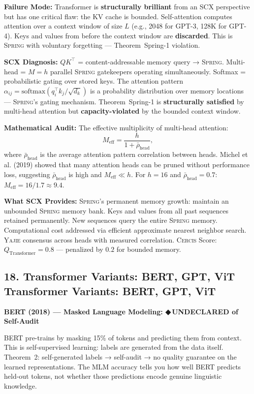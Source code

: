 \documentclass[12pt,a4paper]{article}
\theoremstyle{definition}
\newcommand{\guilty}{{\color{guiltycolor}\textbf{◆\,UNDECLARED}}}
\newcommand{\Yajie}{\textsc{Yajie}}
\newcommand{\Spring}{\textsc{Spring}}
\newcommand{\Cercis}{\textsc{Cercis}}
\newcommand{\SCX}{\textsc{SCX}}
\newcommand{\auditHeader}[1]{\medskip\noindent\textbf{\large #1}\medskip}
\newcommand{\whyFail}{\noindent\textbf{Failure Mode:} }
\newcommand{\whatMissing}{\noindent\textbf{What SCX Provides:} }
\newcommand{\diagnosis}{\noindent\textbf{SCX Diagnosis:} }
\newcommand{\mathAudit}{\noindent\textbf{Mathematical Audit:} }
\begin{document}
\whyFail{} Transformer is \textbf{structurally brilliant} from an \SCX{} perspective but has one critical flaw: the KV cache is bounded. Self-attention computes attention over a context window of size $L$ (e.g., 2048 for GPT-3, 128K for GPT-4). Keys and values from before the context window are \textbf{discarded}. This is \Spring{} with voluntary forgetting — Theorem~Spring-1 violation.

\diagnosis{} $QK^\top$ = content-addressable memory query → \Spring{}. Multi-head = $M = h$ parallel \Spring{} gatekeepers operating simultaneously. Softmax = probabilistic gating over stored keys. The attention pattern $\alpha_{ij} = \text{softmax}(q_i^\top k_j / \sqrt{d_k})$ is a probability distribution over memory locations — \Spring{}'s gating mechanism. Theorem~Spring-1 is \textbf{structurally satisfied} by multi-head attention but \textbf{capacity-violated} by the bounded context window.

\mathAudit{} The effective multiplicity of multi-head attention:
\[
M_{\text{eff}} = \frac{h}{1 + \bar{\rho}_{\text{head}}},
\]
where $\bar{\rho}_{\text{head}}$ is the average attention pattern correlation between heads. Michel et al. (2019) showed that many attention heads can be pruned without performance loss, suggesting $\bar{\rho}_{\text{head}}$ is high and $M_{\text{eff}} \ll h$. For $h=16$ and $\bar{\rho}_{\text{head}}=0.7$: $M_{\text{eff}} = 16/1.7 \approx 9.4$.

\whatMissing{} \Spring{}'s permanent memory growth: maintain an unbounded \Spring{} memory bank. Keys and values from all past sequences retained permanently. New sequences query the entire \Spring{} memory. Computational cost addressed via efficient approximate nearest neighbor search. \Yajie{} consensus across heads with measured correlation. \Cercis{} Score: $Q_{\text{Transformer}} = 0.8$ — penalized by $0.2$ for bounded memory.

\subsection{18. Transformer Variants: BERT, GPT, ViT Transformer Variants: BERT, GPT, ViT}

\auditHeader{BERT (2018) — Masked Language Modeling: \guilty{} of Self-Audit}

BERT pre-trains by masking 15\% of tokens and predicting them from context. This is self-supervised learning: labels are generated from the data itself. Theorem~2: self-generated labels → self-audit → no quality guarantee on the learned representations. The MLM accuracy tells you how well BERT predicts held-out tokens, not whether those predictions encode genuine linguistic knowledge.
\end{document}
